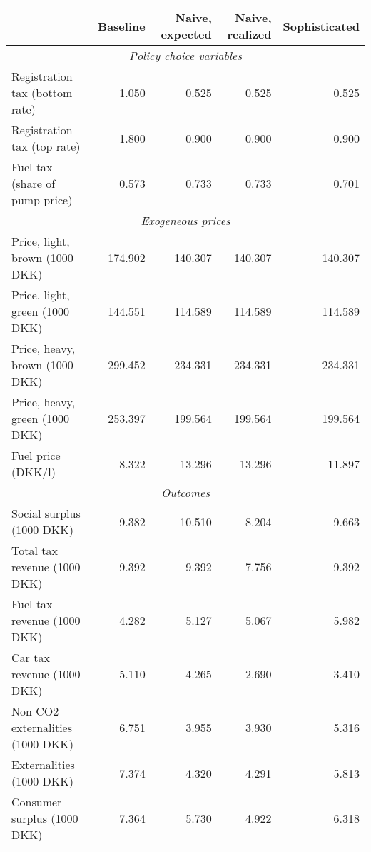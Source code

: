 

\begin{tabular}{lrrrr} 
\toprule 
                                         &     Baseline& Naive, expected& Naive, realized& Sophisticated \\ 
\midrule 
\multicolumn{5}{c}{\emph{Policy choice variables}} \\ 
\midrule
          Registration tax (bottom rate) &        1.050&        0.525&        0.525&        0.525 \\ 
             Registration tax (top rate) &        1.800&        0.900&        0.900&        0.900 \\ 
          Fuel tax (share of pump price) &        0.573&        0.733&        0.733&        0.701 \\ 
\midrule 
\multicolumn{5}{c}{\emph{Exogeneous prices}} \\ 
\midrule
          Price, light, brown (1000 DKK) &      174.902&      140.307&      140.307&      140.307 \\ 
          Price, light, green (1000 DKK) &      144.551&      114.589&      114.589&      114.589 \\ 
          Price, heavy, brown (1000 DKK) &      299.452&      234.331&      234.331&      234.331 \\ 
          Price, heavy, green (1000 DKK) &      253.397&      199.564&      199.564&      199.564 \\ 
                      Fuel price (DKK/l) &        8.322&       13.296&       13.296&       11.897 \\ 
\midrule 
\multicolumn{5}{c}{\emph{Outcomes}} \\ 
\midrule
               Social surplus (1000 DKK) &        9.382&       10.510&        8.204&        9.663 \\ 
            Total tax revenue (1000 DKK) &        9.392&        9.392&        7.756&        9.392 \\ 
             Fuel tax revenue (1000 DKK) &        4.282&        5.127&        5.067&        5.982 \\ 
              Car tax revenue (1000 DKK) &        5.110&        4.265&        2.690&        3.410 \\ 
        Non-CO2 externalities (1000 DKK) &        6.751&        3.955&        3.930&        5.316 \\ 
                Externalities (1000 DKK) &        7.374&        4.320&        4.291&        5.813 \\ 
             Consumer surplus (1000 DKK) &        7.364&        5.730&        4.922&        6.318 \\ 

\end{tabular}
